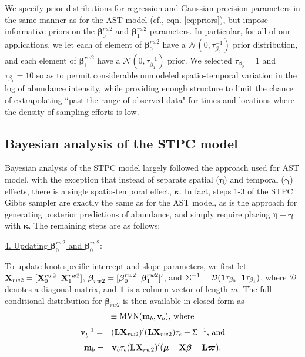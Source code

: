 \documentclass[12pt,fleqn]{article}
\begin{document}
\begin{flushleft}
We specify prior distributions for regression and Gaussian precision parameters in the same manner as for the AST model (cf., eqn. \ref{eq:priors}), but impose informative priors on the $\boldsymbol{\beta}_0^{rw2}$ and $\boldsymbol{\beta}_1^{rw2}$ parameters.  In particular, for all of our applications, we let each of element of $\boldsymbol{\beta}_0^{rw2}$ have a $\mathcal{N}(0,\tau_{\beta_0}^{-1})$ prior distribution, and each element of $\boldsymbol{\beta}_1^{rw2}$ have a $\mathcal{N}(0,\tau_{\beta_1}^{-1})$ prior.  We selected $\tau_{\beta_0} = 1$ and $\tau_{\beta_1} = 10$ so as to permit considerable unmodeled spatio-temporal variation in the log of abundance intensity, while providing enough structure to limit the chance of extrapolating ``past the range of observed data" for times and locations where the density of sampling efforts is low.

\subsection{Bayesian analysis of the STPC model}

Bayesian analysis of the STPC model largely followed the approach used for AST model, with the exception that instead of separate spatial ($\boldsymbol{\eta}$) and temporal ($\boldsymbol{\gamma}$) effects, there is a single spatio-temporal effect, $\boldsymbol{\kappa}$.  In fact, steps 1-3 of the STPC Gibbs sampler are exactly the same as for the AST model, as is the approach for generating posterior predictions of abundance, and simply require placing $\boldsymbol{\eta}+\boldsymbol{\gamma}$ with $\boldsymbol{\kappa}$.  The remaining steps are as follows:

\underline{4. Updating $\boldsymbol{\beta}_0^{rw2}$ and $\boldsymbol{\beta}_0^{rw2}$}:

To update knot-specific intercept and slope parameters, we first let ${\bf X}_{rw2} = [{\bf X}_0^{rw2} \hspace{2mm} {\bf X}_1^{rw2}]$, $\boldsymbol{\beta}_{rw2}=[\boldsymbol{\beta}_0^{rw2} \hspace{2mm} \boldsymbol{\beta}_1^{rw2}]^\prime$, and $\Sigma^{-1} = \mathcal{D}({\bf 1} \tau_{\beta_0} \hspace{2mm} {\bf 1} \tau_{\beta_1})$, where $\mathcal{D}$ denotes a diagonal matrix, and ${\bf 1}$ is a column vector of length $m$. The full conditional distribution for $\boldsymbol{\beta}_{rw2}$ is then available in closed form as
\begin{eqnarray*}
  [\boldsymbol{\beta}_{rw2} | \cdot] \equiv \textrm{MVN}({\bf m}_{b},{\bf v}_{b}) \text{, where}
\end{eqnarray*}
\begin{eqnarray*}
  {\bf v}_{b}^{-1} & = & ({\bf L}{\bf X}_{rw2})^\prime ({\bf L}{\bf X}_{rw2}) \tau_\epsilon + \Sigma^{-1} \text{, and}
\end{eqnarray*}
\begin{eqnarray*}
  {\bf m}_{b} & = & {\bf v}_b \tau_\epsilon ({\bf L}{\bf X}_{rw2})^\prime (\boldsymbol{\mu}- {\bf X} \boldsymbol{\beta} - {\bf L} \boldsymbol{\varpi}).
\end{eqnarray*}


\end{flushleft}
\end{document}
